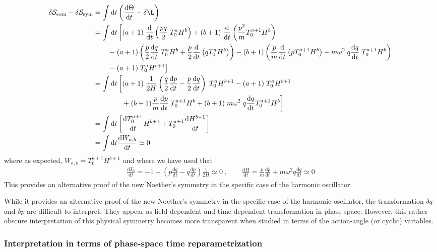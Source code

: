 \documentclass[onecolumn,notitlepage,superscriptaddress, nofootinbib,nobibnotes, aps,prd,10pt]{revtex4-1}%
\def\be{\begin{eqnarray}}
\def\ee{\end{eqnarray}}
\def\S{\mathcal{S}}
\def\nn{\nonumber}
\def\dd{\mathrm{d}}
\begin{document}
\begin{align}
\delta \S_{\text{eom}} - \delta \S_{\text{sym}} & = \int \dd t \left( \frac{\dd \Theta}{\dd t} - \delta \L \right)\\
&  = \int \dd t \left[ (a+1)\;  \frac{\dd}{\dd t} \left( \frac{pq}{2} \; T^a_0 H^b\right) + (b+1) \; \frac{\dd}{\dd t} \left( \frac{p^2}{m} T^{a+1}_0 H^b\right) \right. \nn \\
& \left. \qquad - \; (a+1) \left( \frac{p}{2} \frac{\dd q}{\dd t} \;  T^a_0 H^b + \frac{p}{2} \frac{\dd }{\dd t} \left( q T^a_0 H^b\right)\right) - (b+1) \left( \frac{p}{m} \frac{\dd}{\dd t} \left( p T^{a+1}_0 H^b\right) - m \omega^2 \; q \frac{\dd q}{\dd t} \; T^{a+1}_0 H^b \right) \right. \nn  \\
& \left. \qquad -  \; (a+1) \; T^a_0 H^{b+1}\right] \\
& = \int \dd t \left[ (a+1) \; \frac{1}{2H}\left( \frac{q}{2} \frac{\dd p}{\dd t}   - \frac{p}{2} \frac{\dd q}{\dd t} \right) \; T^a_0 H^{b+1} -  (a+1) \; T^a_0 H^{b+1} \right. \\
& \left. \qquad \qquad + \; (b+1) \frac{p}{m} \frac{\dd p}{\dd t} \; T^{a+1}_0 H^b + (b+1) \; m\omega^2 \; q \frac{\dd q}{\dd t} T^{a+1}_0 H^b \right] \\
& = \int \dd t \left[ \frac{\dd T^{a+1}_0}{\dd t} H^{b+1} + T^{a+1}_0 \frac{\dd H^{b+1}}{\dd t}\right] \\
& = \int \dd t \frac{\dd W_{a,b}}{\dd t} \simeq 0
\end{align}
where as expected, $W_{a,b} = T^{a+1}_0 H^{b+1}$ and where we have used that 
\be
\frac{\dd T_0}{\dd t} = - 1 + \left( p \frac{\dd q}{\dd t} - q \frac{\dd p}{\dd t}\right) \frac{1}{2H} \simeq 0\;, \qquad \frac{\dd H}{\dd t} = \frac{p}{m} \frac{\dd p}{\dd t} + m \omega^2 q \frac{\dd q}{\dd t} \simeq 0
\ee
This provides an alternative proof of the new Noether's symmetry in the specific case of the harmonic oscillator. 

While it provides an alternative proof of the new Noether's symmetry in the specific case of the harmonic oscillator, the transformation $\delta q$ and $\delta p$ are difficult to interpret. They appear as field-dependent and time-dependent transformation in phase space. However, this rather obscure interpretation of this physical symmetry becomes more transparent when studied in terms of the action-angle (or cyclic) variables.



\subsubsection{Interpretation in terms of phase-space time reparametrization }
\end{document}
